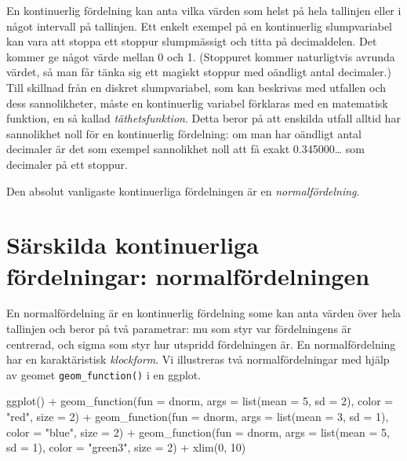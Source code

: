 \documentclass[
]{book}
\newenvironment{Shaded}{\begin{snugshade}}{\end{snugshade}}
\newcommand{\AttributeTok}[1]{\textcolor[rgb]{0.77,0.63,0.00}{#1}}
\newcommand{\DecValTok}[1]{\textcolor[rgb]{0.00,0.00,0.81}{#1}}
\newcommand{\FunctionTok}[1]{\textcolor[rgb]{0.00,0.00,0.00}{#1}}
\newcommand{\NormalTok}[1]{#1}
\newcommand{\SpecialCharTok}[1]{\textcolor[rgb]{0.00,0.00,0.00}{#1}}
\newcommand{\StringTok}[1]{\textcolor[rgb]{0.31,0.60,0.02}{#1}}
\theoremstyle{definition}
\theoremstyle{definition}
\theoremstyle{definition}
\theoremstyle{definition}
\theoremstyle{remark}
\begin{document}
En kontinuerlig fördelning kan anta vilka värden som helst på hela tallinjen eller i något intervall på tallinjen. Ett enkelt exempel på en kontinuerlig slumpvariabel kan vara att stoppa ett stoppur slumpmässigt och titta på decimaldelen. Det kommer ge något värde mellan 0 och 1. (Stoppuret kommer naturligtvis avrunda värdet, så man får tänka sig ett magiskt stoppur med oändligt antal decimaler.) Till skillnad från en diskret slumpvariabel, som kan beskrivas med utfallen och dess sannolikheter, måste en kontinuerlig variabel förklaras med en matematisk funktion, en så kallad \emph{täthetsfunktion}. Detta beror på att enskilda utfall alltid har sannolikhet noll för en kontinuerlig fördelning: om man har oändligt antal decimaler är det som exempel sannolikhet noll att få exakt 0.345000\ldots{} som decimaler på ett stoppur.

Den absolut vanligaste kontinuerliga fördelningen är en \emph{normalfördelning}.

\hypertarget{suxe4rskilda-kontinuerliga-fuxf6rdelningar-normalfuxf6rdelningen}{%
\section{Särskilda kontinuerliga fördelningar: normalfördelningen}\label{suxe4rskilda-kontinuerliga-fuxf6rdelningar-normalfuxf6rdelningen}}

En normalfördelning är en kontinuerlig fördelning some kan anta värden över hela tallinjen och beror på två parametrar: mu som styr var fördelningens är centrerad, och sigma som styr hur utspridd fördelningen är.
En normalfördelning har en karaktäristisk \emph{klockform}. Vi illustreras två normalfördelningar med hjälp av geomet \texttt{geom\_function()} i en ggplot.

\begin{Shaded}
\begin{Highlighting}[]
\FunctionTok{ggplot}\NormalTok{() }\SpecialCharTok{+}
  \FunctionTok{geom\_function}\NormalTok{(}\AttributeTok{fun =}\NormalTok{ dnorm, }\AttributeTok{args =} \FunctionTok{list}\NormalTok{(}\AttributeTok{mean =} \DecValTok{5}\NormalTok{, }\AttributeTok{sd =} \DecValTok{2}\NormalTok{), }\AttributeTok{color =} \StringTok{"red"}\NormalTok{, }\AttributeTok{size =} \DecValTok{2}\NormalTok{) }\SpecialCharTok{+}
  \FunctionTok{geom\_function}\NormalTok{(}\AttributeTok{fun =}\NormalTok{ dnorm, }\AttributeTok{args =} \FunctionTok{list}\NormalTok{(}\AttributeTok{mean =} \DecValTok{3}\NormalTok{, }\AttributeTok{sd =} \DecValTok{1}\NormalTok{), }\AttributeTok{color =} \StringTok{"blue"}\NormalTok{, }\AttributeTok{size =} \DecValTok{2}\NormalTok{) }\SpecialCharTok{+}
  \FunctionTok{geom\_function}\NormalTok{(}\AttributeTok{fun =}\NormalTok{ dnorm, }\AttributeTok{args =} \FunctionTok{list}\NormalTok{(}\AttributeTok{mean =} \DecValTok{5}\NormalTok{, }\AttributeTok{sd =} \DecValTok{1}\NormalTok{), }\AttributeTok{color =} \StringTok{"green3"}\NormalTok{, }\AttributeTok{size =} \DecValTok{2}\NormalTok{) }\SpecialCharTok{+}
  \FunctionTok{xlim}\NormalTok{(}\DecValTok{0}\NormalTok{, }\DecValTok{10}\NormalTok{)}
\end{Highlighting}
\end{Shaded}
\end{document}
